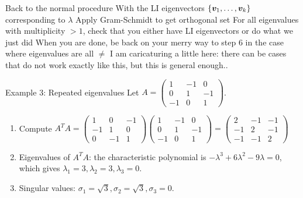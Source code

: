 \documentclass[aspectratio=169]{beamer}\usepackage[]{graphicx}\usepackage[]{xcolor}
\begin{document}
\begin{frame}{Back to the normal procedure}
With the LI eigenvectors $\{\bm{v}_1,\ldots,\bm{v}_k\}$ corresponding to $\lambda$
\vfill
Apply Gram-Schmidt to get orthogonal set
\vfill
For all eigenvalues with multiplicity $>1$, check that you either have LI eigenvectors or do what we just did
\vfill
When you are done, be back on your merry way to step 6 in the case where eigenvalues are all $\neq$
\vfill
I am caricaturing a little here: there can be cases that do not work exactly like this, but this is general enough..
\end{frame}


\begin{frame}{Example 3: Repeated eigenvalues}
Let $A = \begin{pmatrix} 1 & -1 & 0 \\ 0 & 1 & -1 \\ -1 & 0 & 1 \end{pmatrix}$.
\vfill
\begin{enumerate}
\item Compute $A^TA = \begin{pmatrix} 1 & 0 & -1 \\ -1 & 1 & 0 \\ 0 & -1 & 1 \end{pmatrix} \begin{pmatrix} 1 & -1 & 0 \\ 0 & 1 & -1 \\ -1 & 0 & 1 \end{pmatrix} = \begin{pmatrix} 2 & -1 & -1 \\ -1 & 2 & -1 \\ -1 & -1 & 2 \end{pmatrix}$
\item Eigenvalues of $A^TA$: the characteristic polynomial is $-\lambda^3 + 6\lambda^2 - 9\lambda = 0$, which gives $\lambda_1=3, \lambda_2=3, \lambda_3=0$.
\item Singular values: $\sigma_1=\sqrt{3}, \sigma_2=\sqrt{3}, \sigma_3=0$.
\end{enumerate}
\end{frame}
\end{document}
